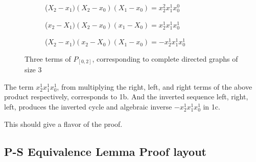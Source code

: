 \documentclass[11pt, oneside]{article} 	%
\begin{document}
\begin{figure}
\centering
\begin{subfigure}{.5\textwidth}
  \centering
  \caption{($X_2-x_1)(X_2-x_0)(X_1-x_0) = x_2^2x_1^1x_0^0$}
  \label{fig:sub1}
\end{subfigure}

\begin{subfigure}{.5\textwidth}

  \caption{($x_2-X_1)(X_2-x_0)(x_1-X_0)= x_2^1x_1^1x_0^1$}
  \label{fig:sub2}
\end{subfigure}

\begin{subfigure}{.5\textwidth}

  \caption{($X_2-x_1)(x_2-X_0)(X_1-x_0) = -x_2^1x_1^1x_0^1$}
  \label{fig:sub3}
\end{subfigure}


\caption{Three terms of  $P_{[0,2]}$, corresponding to complete directed graphs of size 3}
\label{fig:test}
\end{figure}

The term $x_2^1x_1^1x_0^1$, from multiplying the right, left, and right terms of the above product respectively, corresponds to 1b.  And the inverted sequence left, right, left, produces the inverted cycle and algebraic inverse $-x_2^1x_1^1x_0^1$ in 1c.

This should give a flavor of the proof.
\subsection{P-S Equivalence Lemma Proof layout}
\end{document}
